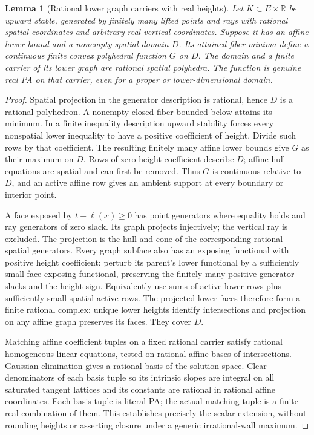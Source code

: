 \documentclass[11pt]{article}
\newtheorem{lemma}[theorem]{Lemma}
\newcommand{\R}{\mathbb R}
\begin{document}
\begin{lemma}[Rational lower graph carriers with real heights]\label{lem:graph}
Let $K\subset E\times\R$ be upward stable, generated by finitely many lifted points and rays with rational spatial coordinates and arbitrary real vertical coordinates. Suppose it has an affine lower bound and a nonempty spatial domain $D$. Its attained fiber minima define a continuous finite convex polyhedral function $G$ on $D$. The domain and a finite carrier of its lower graph are rational spatial polyhedra. The function is genuine real PA on that carrier, even for a proper or lower-dimensional domain.
\end{lemma}
\begin{proof}
Spatial projection in the generator description is rational, hence $D$ is a rational polyhedron. A nonempty closed fiber bounded below attains its minimum. In a finite inequality description upward stability forces every nonspatial lower inequality to have a positive coefficient of height. Divide such rows by that coefficient. The resulting finitely many affine lower bounds give $G$ as their maximum on $D$. Rows of zero height coefficient describe $D$; affine-hull equations are spatial and can first be removed. Thus $G$ is continuous relative to $D$, and an active affine row gives an ambient support at every boundary or interior point.

A face exposed by $t-\ell(x)\geq0$ has point generators where equality holds and ray generators of zero slack. Its graph projects injectively; the vertical ray is excluded. The projection is the hull and cone of the corresponding rational spatial generators. Every graph subface also has an exposing functional with positive height coefficient: perturb its parent's lower functional by a sufficiently small face-exposing functional, preserving the finitely many positive generator slacks and the height sign. Equivalently use sums of active lower rows plus sufficiently small spatial active rows. The projected lower faces therefore form a finite rational complex: unique lower heights identify intersections and projection on any affine graph preserves its faces. They cover $D$.

Matching affine coefficient tuples on a fixed rational carrier satisfy rational homogeneous linear equations, tested on rational affine bases of intersections. Gaussian elimination gives a rational basis of the solution space. Clear denominators of each basis tuple so its intrinsic slopes are integral on all saturated tangent lattices and its constants are rational in rational affine coordinates. Each basis tuple is literal PA; the actual matching tuple is a finite real combination of them. This establishes precisely the scalar extension, without rounding heights or asserting closure under a generic irrational-wall maximum.
\end{proof}
\end{document}
